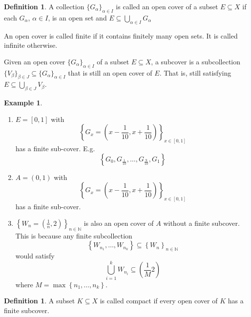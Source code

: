 \documentclass[12pt]{article}
\theoremstyle{definition}
\newtheorem{definition}[theorem]{Definition}
\newtheorem{example}[theorem]{Example}
\theoremstyle{remark}
\begin{document}
\begin{definition}
    A collection $\{G_\alpha\}_{\alpha \in I}$ is called an open cover of a subset $E\subseteq X$ if each $G_\alpha$, $\alpha \in I$, is an open set and $E \subseteq \bigcup_{\alpha \in I} G_\alpha$

    An open cover is called finite if it contains finitely many open sets.
    It is called infinite otherwise.

    Given an open cover $\{G_\alpha\}_{\alpha \in I}$ of a subset $E\subseteq X$, a subcover is a subcollection 
    $\{V_\beta\}_{\beta \in J} \subseteq \{G_\alpha\}_{\alpha \in I}$ that is still an open cover of $E$.
    That is, still satisfying $E \subseteq \bigcup_{\beta \in J} V_\beta$.
\end{definition}
\begin{example}
    \hfill
    \begin{enumerate}
        \item $E = [0, 1]$ with
            $$\left\{G_x = \left(x - \frac{1}{10}, x + \frac{1}{10}\right)\right\}_{x \in [0, 1]}$$ has a finite sub-cover. E.g.
            $$\left\{G_0, G_{\frac{1}{10}}, \ldots, G_{\frac{9}{10}}, G_1\right\}$$
        \item $A = (0, 1)$ with
            $$\left\{G_x = \left(x - \frac{1}{10}, x + \frac{1}{10}\right)\right\}_{x \in [0, 1]}$$ has a finite sub-cover.
        \item $\left\{W_n = \left(\frac{1}{n}, 2\right)\right\}_{n \in \mathbb{N}}$ is also an open cover of $A$ without a finite subcover. This is because any finite subcollection
            $$\left\{W_{n_1}, \ldots, W_{n_k}\right\} \subseteq \left\{W_n\right\}_{n \in \mathbb{N}}$$
            would satisfy
            $$\bigcup_{i=1}^k W_{n_i} \subseteq \left(\frac{1}{M} 2\right)$$
            where $M = \max\left\{n_1, \ldots, n_k\right\}$.
    \end{enumerate}
\end{example}
\begin{definition}
    A subset $K \subseteq X$ is called compact if every open cover of $K$ has a finite subcover.
\end{definition}
\end{document}
